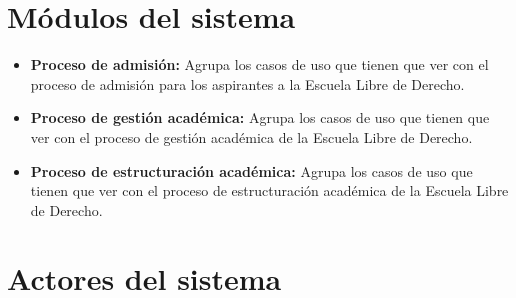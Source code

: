 
\section{Módulos del sistema}

%

    \begin{figure}[h!]
	\begin{center}
	\end{center}
    \end{figure}

    \begin{itemize}
	\item {\bf Proceso de admisión:} Agrupa los casos de uso que tienen que ver con el proceso de admisión para los aspirantes a la Escuela Libre de Derecho. 

	
	\item {\bf Proceso de gestión académica:} Agrupa los casos de uso que tienen que ver con el proceso de gestión académica de la Escuela Libre de Derecho. 
	
	\item {\bf Proceso de estructuración académica:} Agrupa los casos de uso que tienen que ver con el proceso de estructuración académica de la Escuela Libre de Derecho. 
    \end{itemize}

\section{Actores del sistema}\label{sec:Comportamiento:ActoresSistema}

